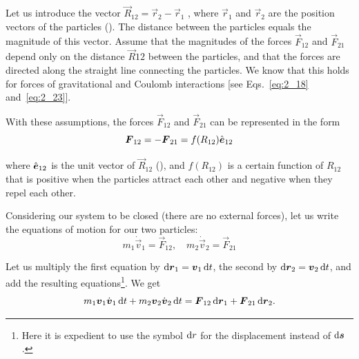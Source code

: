 Let us introduce the vector $\vec{R}_{12}=\vec{r}_2-\vec{r}_1$ , where $\vec{r}_1$ and $\vec{r}_2$ are the position vectors of the particles (). The distance between the particles equals the magnitude of this vector. Assume that the magnitudes of the forces $\vec{F}_{12}$ and $\vec{F}_{21}$ depend only on the distance $\vec{R}{12}$ between the particles, and that the forces are directed along the straight line connecting the particles. We know that this holds for forces of gravitational and Coulomb interactions [see Eqs.~\eqref{eq:2_18} and~\eqref{eq:2_23}].

With these assumptions, the forces $\vec{F}_{12}$ and $\vec{F}_{21}$ can be represented in the form
\vspace{-12pt}
\begin{equation}\label{eq:3_41}
\boldsymbol{F}_{12} = -\boldsymbol{F}_{21} = f(R_{12})\hat{\boldsymbol{e}}_{12}
\end{equation}

\noindent
where $\hat{\boldsymbol{e}}_{12}$ is the unit vector of $\vec{R}_{12}$ (), and $f(R_{12})$ is a certain function of $R_{12}$ that is positive when the particles attract each other and negative when they repel each other.

Considering our system to be closed (there are no external forces), let us write the equations of motion for our two particles:
\begin{equation*}
m_1\dot{\vec{v}}_1 = \vec{F}_{12},\quad m_2\dot{\vec{v}}_2 = \vec{F}_{21}
\end{equation*}

\noindent
Let us multiply the first equation by $\mathrm{d}\boldsymbol{r}_1=\boldsymbol{v}_1\,\mathrm{d} t$, the second by $\mathrm{d}\boldsymbol{r}_2=\boldsymbol{v}_2\,\mathrm{d} t$, and add the resulting equations\footnote{Here it is expedient to use the symbol $\mathrm{d} r$ for the displacement instead of $\mathrm{d}\boldsymbol{s}$.}. We get
\begin{equation}\label{eq:3_42}
m_1\boldsymbol{v}_1\dot{\boldsymbol{v}}_1\,\mathrm{d} t + m_2\boldsymbol{v}_2\dot{\boldsymbol{v}}_2\,\mathrm{d} t = \boldsymbol{F}_{12}\,\mathrm{d}\boldsymbol{r}_1 + \boldsymbol{F}_{21}\,\mathrm{d}\boldsymbol{r}_2.
\end{equation}


